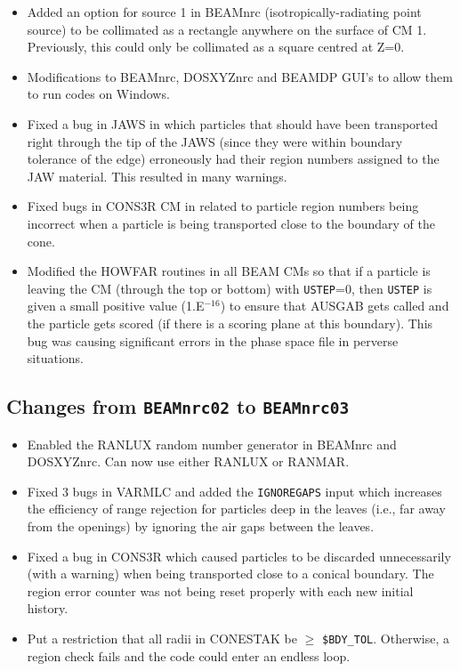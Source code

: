 \documentclass[12pt,twoside]{article}
\begin{document}
\begin{itemize}
\item Added an option for source 1 in BEAMnrc (isotropically-radiating
point source) to be collimated as a rectangle anywhere on the surface of
CM 1.  Previously, this could only be collimated as a square centred at
Z=0.

\item Modifications to BEAMnrc, DOSXYZnrc and BEAMDP GUI's to allow them
to run codes on Windows.

\item Fixed a bug in JAWS in which particles that should have been transported
right through the tip of the JAWS (since they were within boundary tolerance
of the edge) erroneously had their region numbers assigned to the JAW
material.  This resulted in many warnings.

\item Fixed bugs in CONS3R CM in related to particle region numbers being
incorrect when a particle is being transported close to the boundary
of the cone.

\item Modified the HOWFAR routines in all BEAM CMs so that if a particle
is leaving the CM (through the top or bottom) with {\tt USTEP}=0, then
{\tt USTEP} is given a small positive value (1.E$^{-16}$) to ensure that
AUSGAB gets called and the particle gets scored (if there is a scoring
plane at this boundary). This bug was causing significant errors in the
phase space file in perverse situations.

\end{itemize}

\subsection{Changes from {\tt BEAMnrc02} to {\tt BEAMnrc03}}

\begin{itemize}

\item Enabled the RANLUX random number generator in BEAMnrc and
DOSXYZnrc.  Can now use either RANLUX or RANMAR.

\item Fixed 3 bugs in VARMLC and added the {\tt IGNOREGAPS} input which
increases the efficiency of range rejection for particles deep in the
leaves (i.e., far away from the openings) by ignoring the air gaps between
the leaves.

\item Fixed a bug in CONS3R which caused particles to be discarded
unnecessarily (with a warning) when being transported close to a conical
boundary.  The region error counter was not being reset properly with
each new initial history.

\item Put a restriction that all radii in CONESTAK be $\geq$ {\tt \$BDY\_TOL}.
Otherwise, a region check fails and the code could enter an endless
loop.

\end{itemize}
\end{document}
